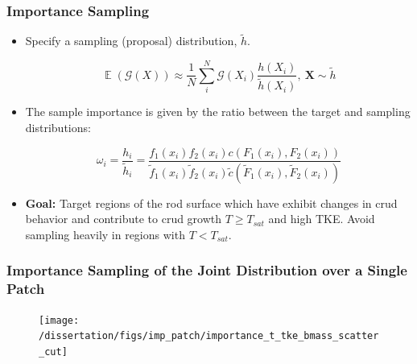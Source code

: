 \documentclass[t, pdftex]{beamer}
\DeclareMathOperator*{\E}{\mathbb{E}}
\begin{document}
\begin{frame}
\frametitle{Importance Sampling}
\vspace{-16pt}
\begin{itemize}
    \item Specify a sampling (proposal) distribution, $\tilde h$.

\begin{equation}
\E(\mathcal G(X)) \approx \frac{1}{N} \sum_i^N \mathcal G(X_i) \frac{h(X_i)}{\tilde h(X_i)}, \ \mathbf{X} \sim \tilde{h} \nonumber
\label{eq:mc_imp_expected_crud}
\end{equation}

\item The sample importance is given by the ratio between the target and sampling distributions:
    
    \begin{equation}
    \omega_i = \frac{h_i}{\tilde h_i} = \frac{f_1(x_i) f_2(x_i)c(F_1(x_i), F_2(x_i))}{\tilde f_1(x_i) \tilde f_2(x_i) \tilde c(\tilde F_1(x_i), \tilde F_2(x_i))} \nonumber
    \label{eq:imp_prob_ratio}
    \end{equation}

    \item \textbf{Goal:}  Target regions of the rod surface which have exhibit changes in crud behavior and contribute to crud growth $T \ge T_{sat}$ and high TKE.  Avoid sampling heavily in regions with $T<T_{sat}$.
\end{itemize}
\end{frame}

\begin{frame}
\frametitle{\small Importance Sampling of the Joint Distribution over a Single Patch}
\vspace{-16pt}
\begin{figure}[!htbp]
    \centering
    \texttt{[image: /dissertation/figs/imp\_patch/importance\_t\_tke\_bmass\_scatter\_cut]}
    \label{model_overview}
\end{figure}
\end{frame}
\end{document}
